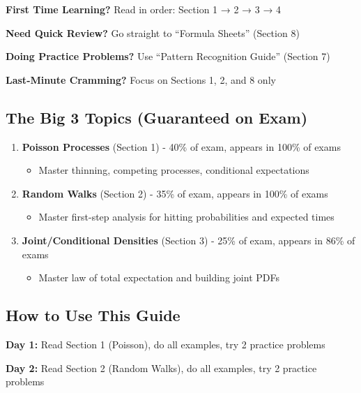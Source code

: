 \documentclass[10pt,letterpaper]{article}
\begin{document}
\begin{tcolorbox}[colback=yellow!20,colframe=orange!80,arc=3mm]
\textbf{First Time Learning?} Read in order: Section 1 → 2 → 3 → 4

\textbf{Need Quick Review?} Go straight to ``Formula Sheets'' (Section 8)

\textbf{Doing Practice Problems?} Use ``Pattern Recognition Guide'' (Section 7)

\textbf{Last-Minute Cramming?} Focus on Sections 1, 2, and 8 only
\end{tcolorbox}

\subsection*{The Big 3 Topics (Guaranteed on Exam)}

\begin{enumerate}[leftmargin=*]
  \item \textbf{Poisson Processes} (Section 1) - 40\% of exam, appears in 100\% of exams
    \begin{itemize}
      \item Master thinning, competing processes, conditional expectations
    \end{itemize}

  \item \textbf{Random Walks} (Section 2) - 35\% of exam, appears in 100\% of exams
    \begin{itemize}
      \item Master first-step analysis for hitting probabilities and expected times
    \end{itemize}

  \item \textbf{Joint/Conditional Densities} (Section 3) - 25\% of exam, appears in 86\% of exams
    \begin{itemize}
      \item Master law of total expectation and building joint PDFs
    \end{itemize}
\end{enumerate}

\subsection*{How to Use This Guide}

\textbf{Day 1:} Read Section 1 (Poisson), do all examples, try 2 practice problems

\textbf{Day 2:} Read Section 2 (Random Walks), do all examples, try 2 practice problems
\end{document}
